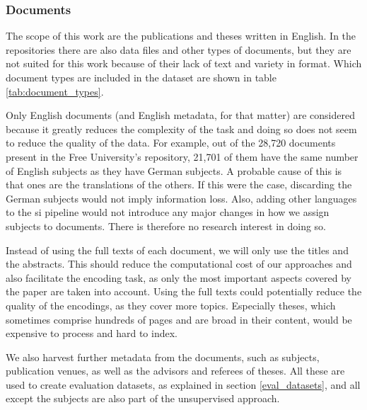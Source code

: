 \subsubsection{Documents} \label{problem_scope_docs}

The scope of this work are the publications and theses written in English. In the repositories there are also data files and other types of documents, but they are not suited for this work because of their lack of text and variety in format. Which document types are included in the dataset are shown in table \ref{tab:document_types}.

Only English documents (and English metadata, for that matter) are considered because it greatly reduces the complexity of the task and doing so does not seem to reduce the quality of the data. For example, out of the 28,720 documents present in the Free University's repository, 21,701 of them have the same number of English subjects as they have German subjects. A probable cause of this is that ones are the translations of the others. If this were the case, discarding the German subjects would not imply information loss. Also, adding other languages to the \acrshort{si} pipeline would not introduce any major changes in how we assign subjects to documents. There is therefore no research interest in doing so.

Instead of using the full texts of each document, we will only use the titles and the abstracts. This should reduce the computational cost of our approaches and also facilitate the encoding task, as only the most important aspects covered by the paper are taken into account. Using the full texts could potentially reduce the quality of the encodings, as they cover more topics. Especially theses, which sometimes comprise hundreds of pages and are broad in their content, would be expensive to process and hard to index.

We also harvest further metadata from the documents, such as subjects, publication venues, as well as the advisors and referees of theses. All these are used to create evaluation datasets, as explained in section \ref{eval_datasets}, and all except the subjects are also part of the unsupervised approach.

